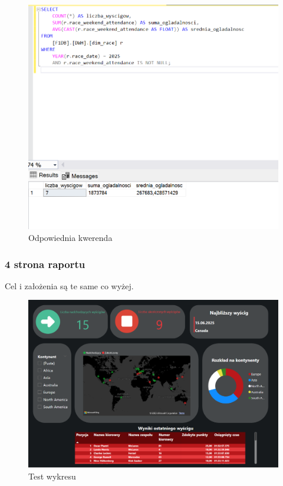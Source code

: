 \documentclass[12pt]{article}
\begin{document}
\begin{figure}[H]
    \centering   \includegraphics[width=\textwidth]{t10.png}
    \caption{Odpowiednia kwerenda}
\end{figure}

\subsubsection*{4 strona raportu}
Cel i założenia są te same co wyżej.
\begin{figure}[H]
    \centering   \includegraphics[width=\textwidth]{t11.png}
    \caption{Test wykresu}
\end{figure}
\end{document}

